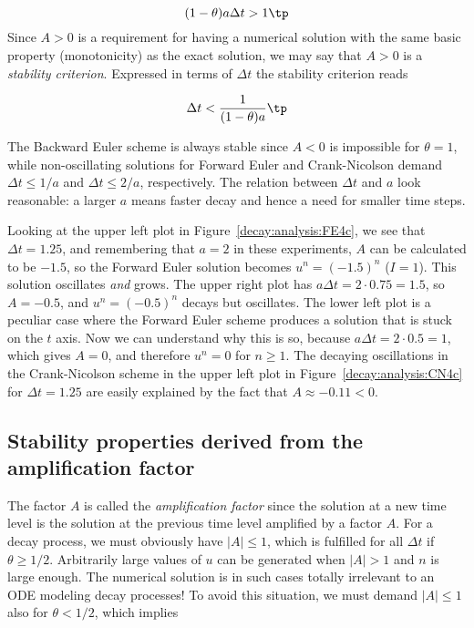 \documentclass[graybox,sectrefs,envcountresetchap,open=right,final]{svmonodo}
\begin{document}
\begin{equation}
(1-\theta)a\Delta t > 1 \tp
\label{decay:th:stability}
\end{equation}
Since $A>0$ is a requirement for having a numerical solution with the
same basic property (monotonicity) as the exact solution, we may say
that $A>0$ is a \emph{stability criterion}. Expressed in terms of $\Delta t$
the stability criterion reads

\begin{equation}
\Delta t < \frac{1}{(1-\theta)a}\tp
\end{equation}

The Backward
Euler scheme is always stable since $A < 0$ is impossible for $\theta=1$, while
non-oscillating solutions for Forward Euler and Crank-Nicolson
demand $\Delta t\leq 1/a$ and $\Delta t\leq 2/a$, respectively.
The relation between $\Delta t$ and $a$ look reasonable: a larger
$a$ means faster decay and hence a need for smaller time steps.

Looking at the upper left plot in Figure~\ref{decay:analysis:FE4c},
we see that $\Delta t=1.25$, and remembering that $a=2$ in these
experiments, $A$ can be calculated to be
$-1.5$, so the Forward Euler solution becomes $u^n=(-1.5)^n$ ($I=1$).
This solution oscillates \emph{and} grows. The upper right plot has
$a\Delta t = 2\cdot 0.75=1.5$, so $A=-0.5$,
and $u^n=(-0.5)^n$ decays but oscillates. The lower left plot
is a peculiar case where the Forward Euler scheme produces a solution
that is stuck on the $t$ axis. Now we can understand why this is so,
because $a\Delta t= 2\cdot 0.5=1$, which gives $A=0$,
and therefore $u^n=0$ for $n\geq 1$.  The decaying oscillations in the Crank-Nicolson scheme in the upper left plot in Figure~\ref{decay:analysis:CN4c}
for $\Delta t=1.25$ are easily explained by the fact that $A\approx -0.11 < 0$.


\subsection{Stability properties derived from the amplification factor}

The factor $A$ is called the \emph{amplification factor} since the solution
at a new time level is the solution at the previous time
level amplified by a factor $A$.
For a decay process, we must obviously have $|A|\leq 1$, which
is fulfilled for all $\Delta t$ if $\theta \geq 1/2$. Arbitrarily
large values of $u$ can be generated when $|A|>1$ and $n$ is large
enough. The numerical solution is in such cases totally irrelevant to
an ODE modeling decay processes! To avoid this situation, we must
demand $|A|\leq 1$ also for $\theta < 1/2$, which implies
\end{document}
